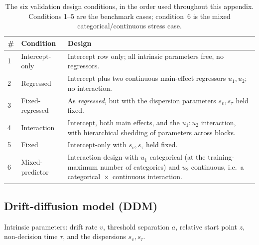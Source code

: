\begin{table}[htbp]
  \centering
  \small
  \begin{tabular}{@{}llp{7.6cm}@{}}
    \toprule
    \# & Condition & Design \\
    \midrule
    1 & Intercept-only    & Intercept row only; all intrinsic parameters free,
                            no regressors. \\
    2 & Regressed         & Intercept plus two continuous main-effect
                            regressors $u_1, u_2$; no interaction. \\
    3 & Fixed-regressed   & As \emph{regressed}, but with the dispersion
                            parameters $s_v, s_\tau$ held fixed. \\
    4 & Interaction       & Intercept, both main effects, and the
                            $u_1{:}u_2$ interaction, with hierarchical
                            shedding of parameters across blocks. \\
    5 & Fixed             & Intercept-only with $s_v, s_\tau$ held fixed. \\
    6 & Mixed-predictor   & Interaction design with $u_1$ categorical (at the
                            training-maximum number of categories) and $u_2$
                            continuous, i.e.\ a categorical~$\times$~continuous
                            interaction. \\
    \bottomrule
  \end{tabular}
  \caption{The six validation design conditions, in the order used throughout
    this appendix. Conditions 1--5 are the benchmark cases; condition~6 is the
    mixed categorical/continuous stress case.}
  \label{tab:mc-conditions}
\end{table}

\FloatBarrier
\clearpage

\subsection{Drift-diffusion model (DDM)}
\label{sec:mc-ddm}

Intrinsic parameters: drift rate $v$, threshold separation $a$, relative start
point $z$, non-decision time $\tau$, and the dispersions $s_v, s_\tau$.


